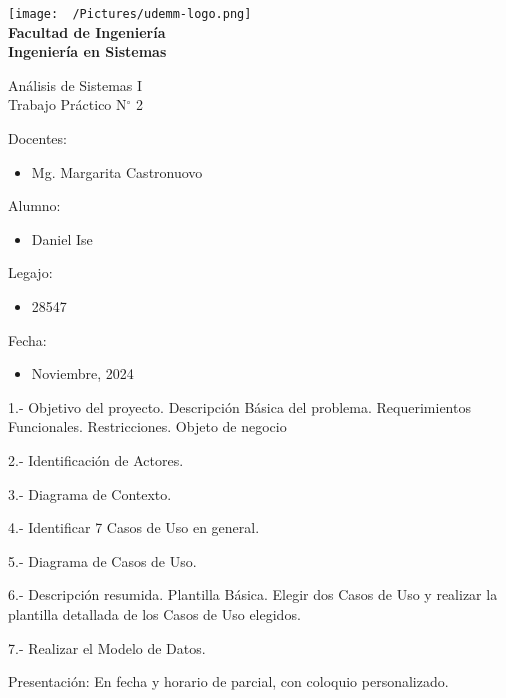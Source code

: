 \documentclass[12pt]{article}
\begin{document}
\thispagestyle{empty}

\begin{center}
	\vspace*{.5cm}
	\texttt{[image: ~/Pictures/udemm-logo.png]}\\
	\vspace{.2cm}
	\Large
	\textbf{Facultad de Ingeniería}\\
	\textbf{Ingeniería en Sistemas}\\
	\vspace{2cm}

	\Huge
	Análisis de Sistemas I\\
	Trabajo Práctico N\(^\circ\) 2 \\
	\vfill

	\raggedright
	\Large
	Docentes:
	\begin{itemize}
		\item[] Mg. Margarita Castronuovo \\
	\end{itemize}
	Alumno:
	\begin{itemize}
		\item[] Daniel Ise
	\end{itemize}
	Legajo:
	\begin{itemize}
		\item[] 28547
	\end{itemize}
	Fecha:
	\begin{itemize}
		\item[] Noviembre, 2024
	\end{itemize}
\end{center}

\pagebreak

1.- Objetivo del proyecto. Descripción Básica del problema. Requerimientos Funcionales. Restricciones. Objeto de negocio

2.- Identificación de Actores.

3.- Diagrama de Contexto.

4.- Identificar 7 Casos de Uso en general.

5.- Diagrama de Casos de Uso.

6.- Descripción resumida. Plantilla Básica. Elegir dos Casos de Uso y realizar la plantilla detallada de los Casos de Uso elegidos.

7.- Realizar el Modelo de Datos.

Presentación: En fecha y horario de parcial, con coloquio personalizado.

\pagebreak
\end{document}
